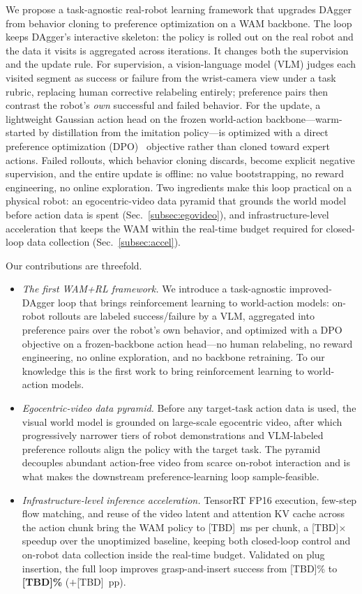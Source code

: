 \documentclass[letterpaper, 10pt, conference]{ieeeconf}
\begin{document}
We propose a task-agnostic real-robot learning framework that upgrades DAgger~\cite{ross2011dagger} from behavior cloning to preference optimization on a WAM backbone. The loop keeps DAgger's interactive skeleton: the policy is rolled out on the real robot and the data it visits is aggregated across iterations. It changes both the supervision and the update rule. For supervision, a vision-language model (VLM) judges each visited segment as success or failure from the wrist-camera view under a task rubric, replacing human corrective relabeling entirely; preference pairs then contrast the robot's \emph{own} successful and failed behavior. For the update, a lightweight Gaussian action head on the frozen world-action backbone---warm-started by distillation from the imitation policy---is optimized with a direct preference optimization (DPO)~\cite{rafailov2023dpo} objective rather than cloned toward expert actions. Failed rollouts, which behavior cloning discards, become explicit negative supervision, and the entire update is offline: no value bootstrapping, no reward engineering, no online exploration. Two ingredients make this loop practical on a physical robot: an egocentric-video data pyramid that grounds the world model before action data is spent (Sec.~\ref{subsec:egovideo}), and infrastructure-level acceleration that keeps the WAM within the real-time budget required for closed-loop data collection (Sec.~\ref{subsec:accel}).

Our contributions are threefold.
\begin{itemize}
\item \emph{The first WAM+RL framework.} We introduce a task-agnostic improved-DAgger loop that brings reinforcement learning to world-action models: on-robot rollouts are labeled success/failure by a VLM, aggregated into preference pairs over the robot's own behavior, and optimized with a DPO objective on a frozen-backbone action head---no human relabeling, no reward engineering, no online exploration, and no backbone retraining. To our knowledge this is the first work to bring reinforcement learning to world-action models.
\item \emph{Egocentric-video data pyramid.} Before any target-task action data is used, the visual world model is grounded on large-scale egocentric video, after which progressively narrower tiers of robot demonstrations and VLM-labeled preference rollouts align the policy with the target task. The pyramid decouples abundant action-free video from scarce on-robot interaction and is what makes the downstream preference-learning loop sample-feasible.
\item \emph{Infrastructure-level inference acceleration.} TensorRT FP16 execution, few-step flow matching, and reuse of the video latent and attention KV cache across the action chunk bring the WAM policy to [TBD]~ms per chunk, a [TBD]$\times$ speedup over the unoptimized baseline, keeping both closed-loop control and on-robot data collection inside the real-time budget. Validated on plug insertion, the full loop improves grasp-and-insert success from [TBD]\% to \textbf{[TBD]\%} ($+$[TBD]~pp).
\end{itemize}
\end{document}
